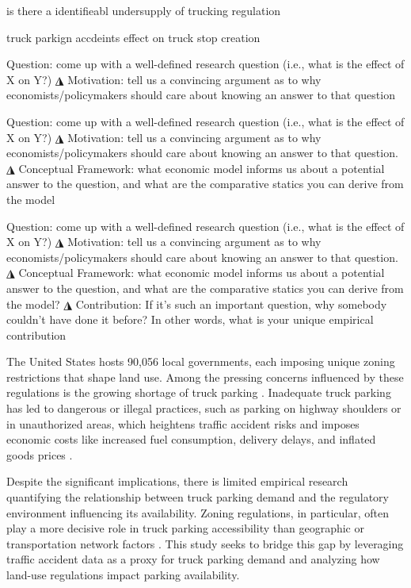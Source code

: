\documentclass[
  12pt]{article}
\begin{document}
is there a identifieabl undersupply of trucking regulation

truck parkign accdeints effect on truck stop creation

Question: come up with a well-defined research question (i.e., what is
the effect of X on Y?) ◮ Motivation: tell us a convincing argument as to
why economists/policymakers should care about knowing an answer to that
question

Question: come up with a well-defined research question (i.e., what is
the effect of X on Y?) ◮ Motivation: tell us a convincing argument as to
why economists/policymakers should care about knowing an answer to that
question. ◮ Conceptual Framework: what economic model informs us about a
potential answer to the question, and what are the comparative statics
you can derive from the model

Question: come up with a well-defined research question (i.e., what is
the effect of X on Y?) ◮ Motivation: tell us a convincing argument as to
why economists/policymakers should care about knowing an answer to that
question. ◮ Conceptual Framework: what economic model informs us about a
potential answer to the question, and what are the comparative statics
you can derive from the model? ◮ Contribution: If it's such an important
question, why somebody couldn't have done it before? In other words,
what is your unique empirical contribution

The United States hosts 90,056 local governments, each imposing unique
zoning restrictions that shape land use. Among the pressing concerns
influenced by these regulations is the growing shortage of truck parking
\citep{american-trucking-associationNationalTruckParking2023}.
Inadequate truck parking has led to dangerous or illegal practices, such
as parking on highway shoulders or in unauthorized areas, which
heightens traffic accident risks and imposes economic costs like
increased fuel consumption, delivery delays, and inflated goods prices
\citep{usdotJasonsLawTruck2015}.

Despite the significant implications, there is limited empirical
research quantifying the relationship between truck parking demand and
the regulatory environment influencing its availability. Zoning
regulations, in particular, often play a more decisive role in truck
parking accessibility than geographic or transportation network factors
\citep{shertzerZoningEconomicGeography2018}. This study seeks to bridge
this gap by leveraging traffic accident data as a proxy for truck
parking demand and analyzing how land-use regulations impact parking
availability.
\end{document}
